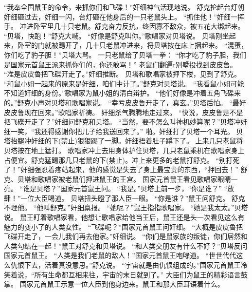 \documentclass[a4paper,12pt,UTF8,twoside]{ctexbook}
\begin{document}
        “我奉全国鼠王的命令，来抓你们和飞碟！”奸细神气活现地说。  
        舒克抡起台灯朝奸细砸过去，奸细一闪，台灯砸在他身后的一只老鼠头上。        
        “抓住他！”奸细一挥手。  
        冲进卧室里几十只老鼠。舒克奋力反抗，终因寡不敌众，被五花大绑起来。  
        “贝塔，快跑！”舒克大喊。  
        “好像是舒克叫你。”歌唱家对贝塔说。  
        贝塔刚坐起来，卧室的门就被踢开了，几十只老鼠冲进来，将贝塔按在床上捆起来。  
        “混蛋，你们吃了豹子胆！”贝塔大骂。  
        一只老鼠给了贝塔一拳：  
        “你才吃了豹子胆，我们是国家元首鼠王派来抓你们的，你还敢骂！”  
        老鼠们翻遍r别墅投找到皮皮鲁。  
        “准是皮皮鲁把飞碟开走了。”奸细推断。  
        贝塔和歌唱家被押下楼，见到了舒克。  
        “和鼠小姐一起来的原来是奸细，咱们中计了。”舒克对贝塔说。  
        “我看鼠小姐可能不知道奸细的身份。”歌唱家为鼠小姐的清白辩护。  
        “他们好像是冲着五角飞碟来的。”舒克小声对贝塔和歌唱家说。  
        “幸亏皮皮鲁开走了，真玄。”贝塔后怕。  
        “最好皮皮鲁现在回来。”歌唱家祈祷。  
        奸细杀气腾腾地走过来。  
        “快说，皮皮鲁是不是把飞碟开走了？”奸细问舒克和贝塔。  
        “当然，要不怎么叫神机妙算呢？”贝塔冲奸细一笑，“我还得感谢你把儿子给我送回来了。”  
        啪。奸细打了贝塔一个耳光。  
        贝塔抬腿冲奸细的下(禁止)狠狠踢了一脚。奸细捂着肚子蹲下了。  
        上来几只老鼠将贝塔按在地上猛打。  
        歌唱家冲上去用身体护住贝塔，几只老鼠乘机在歌唱家身上占便宜。舒克猛踢那几只老鼠的下(禁止)。冲上来更多的老鼠打舒克。  
        “别打死了！”奸细强忍着疼站起来，他的感觉是失去了身上最宝贵的东西，“押回去！”  
        舒克、贝塔和歌唱家被老鼠们押进鼠王的王宫。  
        国家元首鼠王看见歌唱家眼睛一亮。  
        “谁是贝塔？”国家元首鼠王问。  
        “我是。”贝塔上前一步，“你是谁？”  
        “放肆！”一位大臣喝道。  
        贝塔扭头瞪了那人臣一眼。  
        “你是谁？”鼠王问舒克。  
        舒克不理他。  
        “他叫舒克。”奸细禀报。  
        “她呢？”鼠王指指歌唱家。  
        “她是我太太。”贝塔说。  
        鼠王盯着歌唱家看，他想让歌唱家给他当王后，鼠王还是头一次看见这么有魅力的变小了的人类女性。  
        “飞碟呢？”国家元首鼠王问奸细。  
        “大概是皮皮鲁把飞碟开走了，一会儿我们再去他家。”奸细说。  
        “你们是鼠家族的叛徒，你们居然和人类勾结在一起！”鼠王对舒克和贝塔说。  
        “和人类交朋友有什么不好？”贝塔反问国家元首鼠王。  
        “人类是我们老鼠的敌人！”国家元首鼠王咆哮道。  
        “世世代代这么仇恨下去，活着真没意思。”舒克说。  
        “宇宙就是由仇恨组成的。”国家元首鼠王冷笑着说，“所有生命都互相来往，宇宙的末日就到了。”  
        大臣们为鼠王的精彩语言鼓掌。  
        国家元首鼠王示意一位大臣到他身边来。鼠王和那大臣耳语着什么。  
\end{document}
